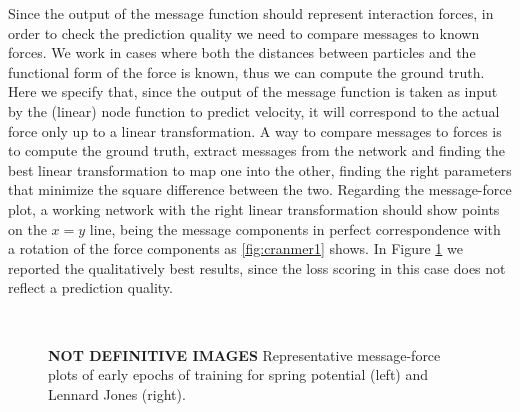\documentclass[../../master_thesis_np.tex]{subfiles}
\begin{document}
Since the output of the message function should represent interaction forces, in order to check the prediction quality we need to compare messages to known forces.
We work in cases where both the distances between particles and the functional form of the force is known, thus we can compute the ground truth.
Here we specify that, since the output of the message function is taken as input by the (linear) node function to predict velocity, it will correspond to the actual force only up to a linear transformation.
A way to compare messages to forces is to compute the ground truth, extract messages from the network and finding the best linear transformation to map one into the other, finding the right parameters that minimize the square difference between the two.
Regarding the message-force plot, a working network with the right linear transformation should show points on the $x = y$ line, being the message components in perfect correspondence with a rotation of the force components as \ref{fig:cranmer1} shows.
In Figure \ref{fig:lincomb} we reported the qualitatively best results, since the loss scoring in this case does not reflect a prediction quality.

\begin{figure}[tp]
	\centering
	\\
	\caption{\textbf{NOT DEFINITIVE IMAGES} Representative message-force plots of early epochs of training for spring potential (left) and Lennard Jones (right).}
	\label{fig:lincomb}
\end{figure}
\end{document}
